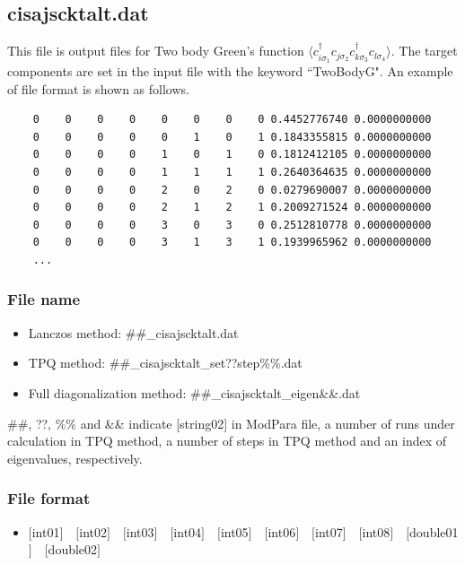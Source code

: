 \newpage
\subsection{cisajscktalt.dat}
\label{Subsec:cisajscktalt}
This file is output files for Two body Green's function $\langle c_{i\sigma_1}^{\dagger}c_{j\sigma_2}c_{k\sigma_3}^{\dagger}c_{l\sigma_4}\rangle$. 
The target components are set in the input file with the keyword ``TwoBodyG".
An example of file format is shown as follows.

\begin{minipage}{15cm}
\begin{screen}
\begin{verbatim}
    0    0    0    0    0    0    0    0 0.4452776740 0.0000000000
    0    0    0    0    0    1    0    1 0.1843355815 0.0000000000
    0    0    0    0    1    0    1    0 0.1812412105 0.0000000000
    0    0    0    0    1    1    1    1 0.2640364635 0.0000000000
    0    0    0    0    2    0    2    0 0.0279690007 0.0000000000
    0    0    0    0    2    1    2    1 0.2009271524 0.0000000000
    0    0    0    0    3    0    3    0 0.2512810778 0.0000000000
    0    0    0    0    3    1    3    1 0.1939965962 0.0000000000
    ...
\end{verbatim}
\end{screen}
\end{minipage}

\subsubsection{File name}
 \begin{itemize}
   \item{Lanczos method:}  \#\#\_cisajscktalt.dat
   \item{TPQ method:} \#\#\_cisajscktalt\_set??step\%\%.dat
   \item{Full diagonalization method:}  \#\#\_cisajscktalt\_eigen{\&\&}.dat
  \end{itemize}
  \#\#, ??, \%\% and \&\& indicate [string02] in ModPara file, a number of runs under calculation in TPQ method, a number of steps in TPQ method and an index of eigenvalues, respectively.


\subsubsection{File format}
 \begin{itemize}
   \item  $[$int01$]$~~$[$int02$]$~~$[$int03$]$~~$[$int04$]$~~$[$int05$]$~~$[$int06$]$~~$[$int07$]$~~$[$int08$]$~~$[$double01$]$~~$[$double02$]$
  \end{itemize}


